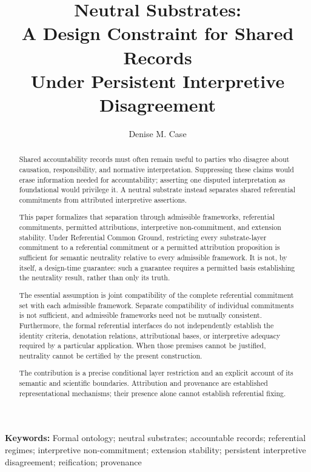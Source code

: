 \documentclass[11pt]{article}
\title{
Neutral Substrates:\\
A Design Constraint for Shared Records\\
Under Persistent Interpretive Disagreement
}
\author{Denise M. Case}
\affil{\small Department of Computer Science and Information Systems\\
Northwest Missouri State University, Maryville, MO, USA\\}
\date{}
\theoremstyle{plain}
\theoremstyle{definition}
\theoremstyle{remark}
\providecommand{\keywords}[1]{\vspace{0.5em}\noindent\textbf{Keywords: }\small #1}
\begin{document}
\maketitle
\vspace{-2em}

\begin{abstract}
  Shared accountability records must often remain useful to parties
  who disagree about causation, responsibility, and normative interpretation.
  Suppressing these claims would erase information needed for accountability;
  asserting one disputed interpretation as foundational would privilege it.
  A neutral substrate instead separates shared referential commitments
  from attributed interpretive assertions.

  This paper formalizes that separation through admissible frameworks,
  referential commitments, permitted attributions, interpretive
  non-commitment, and extension stability. Under Referential Common Ground,
  restricting every substrate-layer commitment to a referential commitment
  or a permitted attribution proposition is sufficient for semantic neutrality
  relative to every admissible framework. It is not, by itself, a
  design-time guarantee: such a guarantee requires a permitted basis
  establishing the neutrality result, rather than only its truth.

  The essential assumption is joint compatibility of the complete
  referential commitment set with each admissible framework.
  Separate compatibility of individual commitments is not sufficient,
  and admissible frameworks need not be mutually consistent.
  Furthermore, the formal referential interfaces do not independently
  establish the identity criteria, denotation relations, attributional bases,
  or interpretive adequacy required by a particular application.
  When those premises cannot be justified, neutrality cannot be certified
  by the present construction.

  The contribution is a precise conditional layer restriction and
  an explicit account of its semantic and scientific boundaries.
  Attribution and provenance are established representational mechanisms;
  their presence alone cannot establish referential fixing.
\end{abstract}


\keywords{
  Formal ontology;
  neutral substrates;
  accountable records;
  referential regimes;
  interpretive non-commitment;
  extension stability;
  persistent interpretive disagreement;
  reification;
  provenance
}
\end{document}
